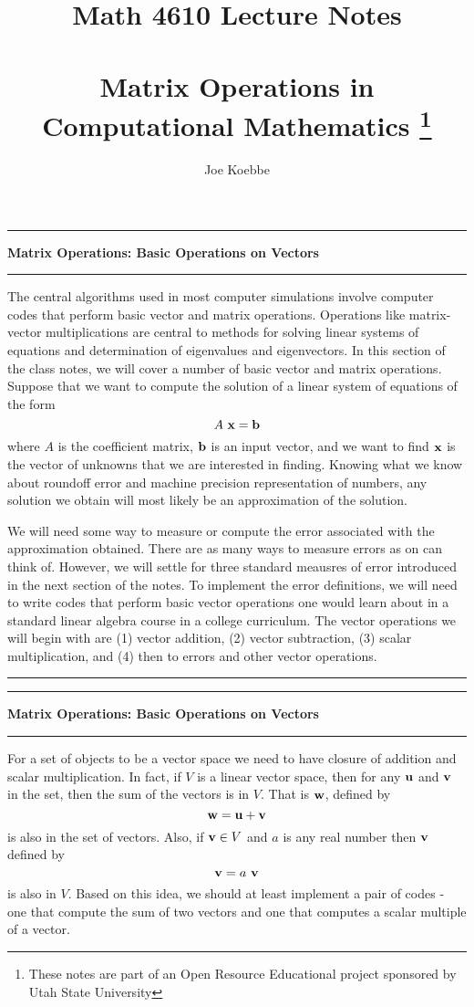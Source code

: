 \documentclass[10pt,fleqn]{article}
\title{Math 4610 Lecture Notes \\
            \ \\
        Matrix Operations in Computational Mathematics
  \footnote{These notes are part of an Open Resource Educational project
            sponsored by Utah State University}}
\author{Joe Koebbe}
\begin{document}
\maketitle
\newpage

\vskip0.1in\hrule\vskip0.1in
\noindent
{\bf Matrix Operations: Basic Operations on Vectors}
\vskip0.1in\hrule\vskip0.1in
\noindent
The central algorithms used in most computer simulations involve computer codes
that perform basic vector and matrix operations. Operations like matrix-vector
multiplications are central to methods for solving linear systems of equations
and determination of eigenvalues and eigenvectors. In this section of the class
notes, we will cover a number of basic vector and matrix operations. Suppose
that we want to compute the solution of a linear system of equations of the form
$$
  A\ {\bf x} = {\bf b}
$$
where $A$ is the coefficient matrix, ${\bf b}$ is an input vector, and we want
to find ${\bf x}$ is the vector of unknowns that we are interested in finding.
Knowing what we know about roundoff error and machine precision representation
of numbers, any solution we obtain will most likely be an approximation of the
solution.

We will need some way to measure or compute the error associated with the
approximation obtained. There are as many ways to measure errors as on can think
of. However, we will settle for three standard meausres of error introduced in
the next section of the notes. To implement the error definitions, we will need
to write codes that perform basic vector operations one would learn about in a
standard linear algebra course in a college curriculum. The vector operations
we will begin with are (1) vector addition, (2) vector subtraction, (3) scalar
multiplication, and (4) then to errors and other vector operations.
\vskip0.1in\hrule\vskip0.1in
\newpage
\vskip0.1in\hrule\vskip0.1in
\noindent
{\bf Matrix Operations: Basic Operations on Vectors}
\vskip0.1in\hrule\vskip0.1in
\noindent
For a set of objects to be a vector space we need to have closure of addition
and scalar multiplication. In fact, if $V$ is a linear vector space, then for
any ${\bf u}$ and ${\bf v}$ in the set, then the sum of the vectors is in $V$.
That is ${\bf w}$, defined by
$$
  {\bf w} = {\bf u} + {\bf v}
$$
is also in the set of vectors. Also, if ${\bf v}\in V$ and $a$ is any real
number then ${\bf v}$ defined by
$$
  {\bf v} = a\ {\bf v}
$$
is also in $V$. Based on this idea, we should at least implement a pair of
codes - one that compute the sum of two vectors and one that computes a scalar
multiple of a vector. 
\end{document}
